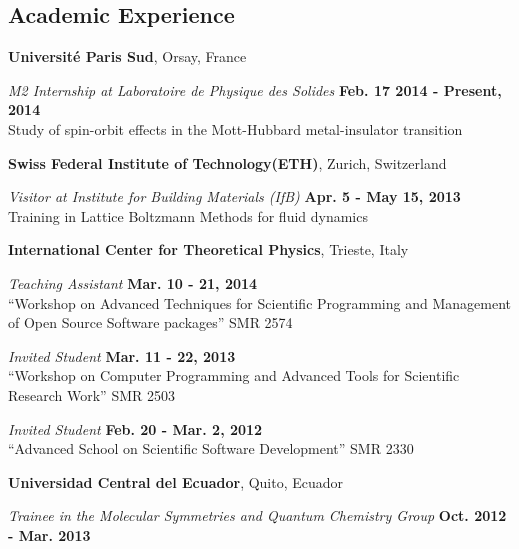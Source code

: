 \documentclass[margin,line]{res}
\newenvironment{list1}{
  \begin{list}{\ding{113}}{%
      \setlength{\itemsep}{0in}
      \setlength{\parsep}{0in} \setlength{\parskip}{0in}
      \setlength{\topsep}{0in} \setlength{\partopsep}{0in}
      \setlength{\leftmargin}{0.17in}}}{\end{list}}
\begin{document}
\begin{resume}
\section{\sc Academic Experience}
  {\bf Université Paris Sud}, Orsay, France
  \begin{list1}
    \item[] {\em M2 Internship at Laboratoire de Physique des Solides}
\hfill {\bf Feb. 17 2014 - Present, 2014}\\
Study of spin-orbit effects in the Mott-Hubbard metal-insulator transition
  \end{list1}

  {\bf Swiss Federal Institute of Technology(ETH)}, Zurich, Switzerland
  \begin{list1}
    \item[] {\em Visitor at Institute for Building Materials (IfB)} \hfill {\bf
Apr. 5 - May 15, 2013}\\
    Training in Lattice Boltzmann Methods for fluid dynamics
  \end{list1}

  {\bf International Center for Theoretical Physics}, Trieste, Italy
  \begin{list1}
    \item[] {\em Teaching Assistant} \hfill {\bf Mar. 10 - 21, 2014} \\
    ``Workshop on Advanced Techniques for Scientific Programming and
Management of Open Source Software packages'' SMR 2574
    \item[] {\em Invited Student} \hfill {\bf Mar. 11 - 22, 2013} \\
    ``Workshop on Computer Programming and Advanced Tools for Scientific
    Research Work'' SMR 2503
    \item[] {\em Invited Student} \hfill {\bf Feb. 20 - Mar. 2, 2012} \\
    ``Advanced School on Scientific Software Development'' SMR 2330
  \end{list1}

  {\bf Universidad Central del Ecuador}, Quito, Ecuador
  \begin{list1}
    \item[] {\em Trainee in the Molecular Symmetries and Quantum Chemistry Group} \hfill {\bf Oct. 2012 - Mar. 2013}
  \end{list1}


\end{resume}
\end{document}
